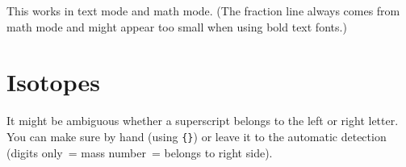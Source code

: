 \documentclass[a4paper,notitlepage,parskip=half]{scrreprt}
\begin{document}
\begin{SideBySideExample}[xrightmargin=2.5cm]
\end{SideBySideExample}

\begin{SideBySideExample}[xrightmargin=2.5cm]
\end{SideBySideExample}

\begin{SideBySideExample}[xrightmargin=2.5cm]
\end{SideBySideExample}

\begin{SideBySideExample}[xrightmargin=2.5cm]
\end{SideBySideExample}

\begin{SideBySideExample}[xrightmargin=2.5cm]
\end{SideBySideExample}

\begin{SideBySideExample}[xrightmargin=2.5cm]
\end{SideBySideExample}

This works in text mode and math mode. (The fraction line always comes from math mode and might appear too small when using bold text fonts.)


\section{Isotopes}

\begin{SideBySideExample}[xrightmargin=2.5cm]
\end{SideBySideExample}

\begin{SideBySideExample}[xrightmargin=2.5cm]
\end{SideBySideExample}

\begin{SideBySideExample}[xrightmargin=2.5cm]
\end{SideBySideExample}

\begin{SideBySideExample}[xrightmargin=2.5cm]
\end{SideBySideExample}

It might be ambiguous whether a superscript belongs to the left or right letter. You can make sure by hand (using \verb|{}|) or leave it to the automatic detection (digits only~= mass number~= belongs to right side).
\end{document}
